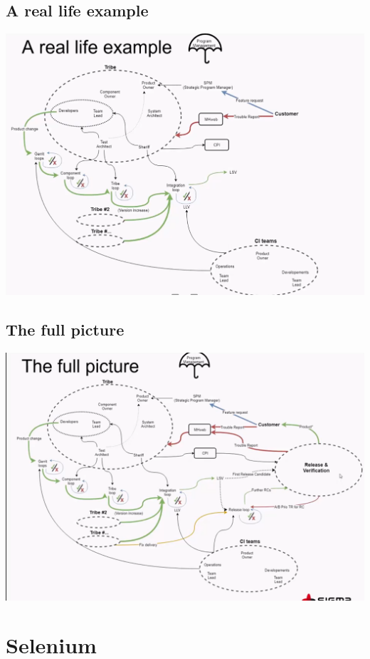 \documentclass[a4paper,14pt, twocolumn]{extarticle}
\begin{document}
		\subsection{A real life example}
			\begin{center}
				\includegraphics[width=20cm]{ex1}
			\end{center}
		\subsection{The full picture}
			\begin{center}
				\includegraphics[width=19cm]{fp}
			\end{center}
		
	\section{Selenium}
		
\end{document}
